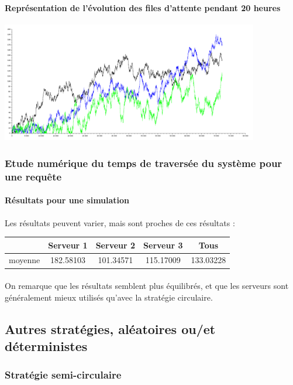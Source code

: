 \documentclass{article}
\begin{document}
\paragraph{Représentation de l'évolution des files d'attente pendant 20 heures}
\begin{center}
	\includegraphics[width=425px]{img/alea20h.png}
\end{center}

\subsubsection{Etude numérique du temps de traversée du système pour une requête}

\paragraph{Résultats pour une simulation}
Les résultats peuvent varier, mais sont proches de ces résultats :
\begin{center}
	\begin{tabular}{c|ccc|c}
		\hline \hline
		& Serveur 1 & Serveur 2 & Serveur 3 & Tous \\
		\hline
		moyenne & 182.58103 & 101.34571 & 115.17009 & 133.03228 \\
		\hline \hline
	\end{tabular}
\end{center}
\paragraph{}
On remarque que les résultats semblent plus équilibrés, et que les serveurs sont généralement mieux utilisés qu'avec la stratégie circulaire.

\subsection{Autres stratégies, aléatoires ou/et déterministes}

\subsubsection{Stratégie semi-circulaire}
\end{document}
